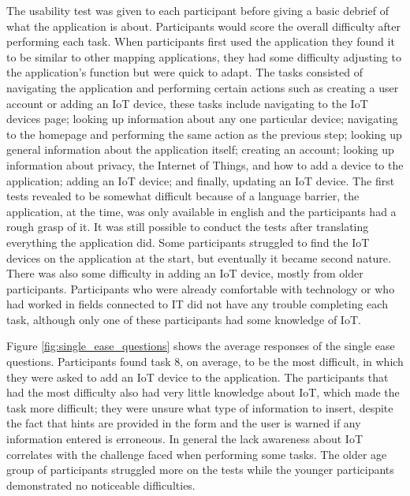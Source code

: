 The usability test was given to each participant before giving a basic debrief
of what the application is about. Participants would score the overall difficulty
after performing each task. When participants first used the application they
found it to be similar to other mapping applications, they had some difficulty
adjusting to the application's function but were quick to adapt. The tasks consisted
of navigating the application and performing certain actions such as creating
a user account or adding an IoT device, these tasks include navigating to the IoT devices
page; looking up information about any one particular device; navigating to the
homepage and performing the same action as the previous step; looking up
general information about the application itself; creating an account;
looking up information about privacy, the Internet of Things, and how
to add a device to the application; adding an IoT device; and finally,
updating an IoT device. The first tests revealed to be
somewhat difficult because of a language barrier, the application, at the
time, was only available in english and the participants had a rough grasp of it.
It was still possible to conduct the tests after translating everything the application
did.
Some participants struggled to
find the IoT devices on the application at the start, but eventually it
became second nature. There was also some difficulty in adding an IoT device,
mostly from older participants. Participants who were already comfortable with
technology or who had worked in fields connected to IT did not have any trouble
completing each task, although only one of these participants had some knowledge
of IoT.

Figure \ref{fig:single_ease_questions} shows the average responses of the
single ease questions. Participants found task 8, on average, to be the most difficult,
in which they were asked to add an IoT device to the application. The
participants that had the most difficulty also had very little knowledge
about IoT, which made the task more difficult; they were unsure what type
of information to insert, despite the fact that hints are provided in the
form and the user is warned if any information entered is erroneous. In
general the lack awareness about IoT correlates with the challenge faced when
performing some tasks. The older age group of participants struggled more on the
tests while the younger participants demonstrated no noticeable difficulties.

